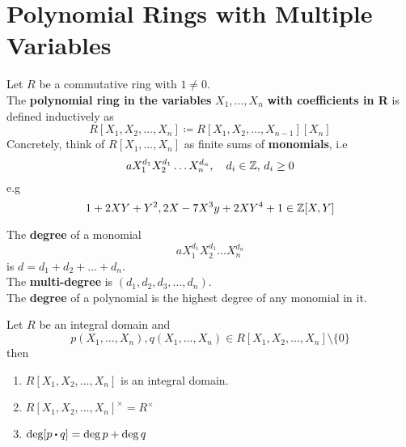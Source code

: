 \documentclass[../Main.tex]{subfiles}
\begin{document}
\section*{Polynomial Rings with Multiple Variables}

\begin{dfn}[title = Multivariable Polynoimal Ring]
	Let $R$ be a commutative ring with $1\ne 0$. \\
	The \textbf{polynomial ring in the variables }$X_1,\dots,X_n$ \textbf{with coefficients in R} is defined inductively as
	\[R[X_1,X_2,\dots,X_n]\coloneqq R[X_1,X_2,\dots,X_{n-1}][X_n]\]
	Concretely, think of $R[X_1,\dots,X_n]$ as finite sums of \textbf{monomials}, i.e 
	\[aX_1^{d_1}X_2^{d_1}\dots X_n^{d_n},\quad d_i\in \mathbb{Z}, \, d_i\ge 0\]
	e.g
	\[1+2XY+Y^2,2X-7X^3y+2XY^4+1\in \mathbb{Z}[X,Y]\]
\end{dfn}
\begin{dfn}[title = {Multi-Degree}]
	The \textbf{degree} of a monomial
	\[aX_1^{d_1}X_2^{d_1}\dots X_n^{d_n}\]
	is $d=d_1+d_2+\dots+d_n$.\\
	The \textbf{multi-degree} is $(d_1,d_2,d_3,\dots,d_n)$.\\
	The \textbf{degree} of a polynomial is the highest degree of any monomial in it.
\end{dfn}
\begin{prop}
	Let $R$ be an integral domain and
	\[p(X_1,\dots,X_n),q(X_1,\dots,X_n)\in R[X_1,X_2,\dots,X_n]\setminus\{0\}\] then
	\begin{enumerate}[label=(\arabic*)]
		\item $R[X_1,X_2,\dots,X_n]$ is an integral domain.
		\item $R[X_1,X_2,\dots,X_n]^\times = R^\times$
		\item $\deg[p\rdot q]=\deg p+\deg q$
	\end{enumerate}
\end{prop}
\end{document}
